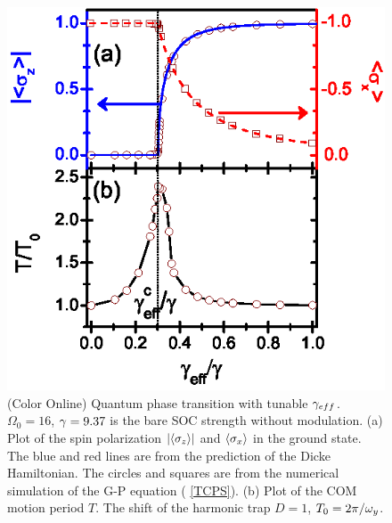 \documentclass[prl,twocolumn,superscriptaddress,showpacs,floatfix]{revtex4}
\begin{document}
\begin{figure}[tbp]
\includegraphics[width=0.7\linewidth]{Fig2.eps}
\caption{(Color Online) Quantum phase transition with tunable $\protect%
\gamma _{eff}$. $\Omega _{0}=16$, $\protect\gamma =9.37$ is the bare SOC
strength without modulation. (a) Plot of the spin polarization $\left\vert
\left\langle \protect\sigma _{z}\right\rangle \right\vert $ and $%
\left\langle \protect\sigma _{x}\right\rangle $ in the ground state. The
blue and red lines are from the prediction of the Dicke Hamiltonian. The
circles and squares are from the numerical simulation of the G-P equation (%
\protect\ref{TCPS}). (b) Plot of the COM motion period $T$. The shift of the
harmonic trap $D=1$, $T_{0}=2\protect\pi /\protect\omega _{y}$.}
\label{QPT}
\end{figure}
\end{document}
